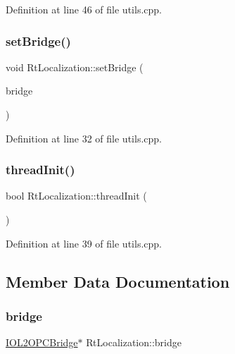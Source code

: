 Definition at line 46 of file utils.\+cpp.

\mbox{\label{classRtLocalization_afe8b9fba68823957649f4aa4b776eb5f}} 
\subsubsection{\texorpdfstring{set\+Bridge()}{setBridge()}}
{\footnotesize\ttfamily void Rt\+Localization\+::set\+Bridge (\begin{DoxyParamCaption}\item[{\hyperlink{group__iol2opc_classIOL2OPCBridge}{I\+O\+L2\+O\+P\+C\+Bridge} $\ast$}]{bridge }\end{DoxyParamCaption})}



Definition at line 32 of file utils.\+cpp.

\mbox{\label{classRtLocalization_ac5d4d7d1e1d54feb6f51c1fc67ada6c9}} 
\subsubsection{\texorpdfstring{thread\+Init()}{threadInit()}}
{\footnotesize\ttfamily bool Rt\+Localization\+::thread\+Init (\begin{DoxyParamCaption}{ }\end{DoxyParamCaption})\hspace{0.3cm}{\ttfamily [protected]}}



Definition at line 39 of file utils.\+cpp.



\subsection{Member Data Documentation}
\mbox{\label{classRtLocalization_a88a0e00cd0879d6faf5c28ccf7851fde}} 
\subsubsection{\texorpdfstring{bridge}{bridge}}
{\footnotesize\ttfamily \hyperlink{group__iol2opc_classIOL2OPCBridge}{I\+O\+L2\+O\+P\+C\+Bridge}$\ast$ Rt\+Localization\+::bridge\hspace{0.3cm}{\ttfamily [protected]}}



